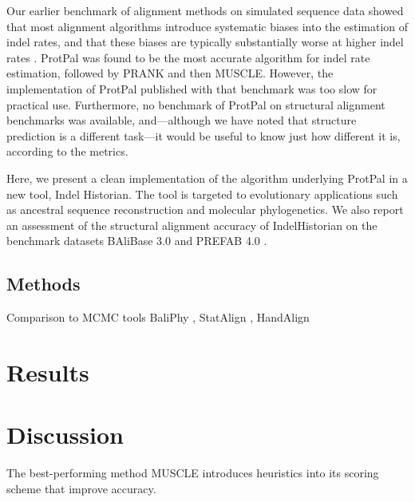\documentclass{bioinfo}
\begin{document}
Our earlier benchmark of alignment methods on simulated sequence data
showed that most alignment algorithms introduce systematic biases into the
estimation of indel rates, and that these biases are typically substantially worse
at higher indel rates \citep{Westesson2012-zg}.
ProtPal was found to be the most accurate algorithm for indel rate estimation,
followed by PRANK and then MUSCLE.
However, the implementation of ProtPal published with that benchmark was too slow
for practical use.
Furthermore, no benchmark of ProtPal on structural alignment benchmarks was available,
and---although we have noted that structure prediction is a different task---it would be
useful to know just how different it is, according to the metrics.

Here, we present a clean implementation of the algorithm underlying ProtPal
in a new tool, Indel Historian.
The tool is targeted to evolutionary applications such
as ancestral sequence reconstruction and molecular phylogenetics.
We also report an assessment of the structural alignment accuracy of IndelHistorian on the benchmark datasets BAliBase 3.0 \citep{ThompsonEtAl2005}
and PREFAB 4.0 \citep{Edgar2010}.

\begin{methods}
\section{Methods}

\citep{Westesson2012-zg}

\end{methods}



Comparison to MCMC tools
BaliPhy \citep{RedelingsSuchard2005,RedelingsSuchard2007,Redelings2014},
StatAlign \citep{NovakEtAl2008,HermanEtAl2014},
HandAlign \citep{WestessonBarquistHolmes2012}


\section{Results}



\section{Discussion}



The best-performing method MUSCLE introduces heuristics into its scoring scheme
that improve accuracy.
\end{document}

